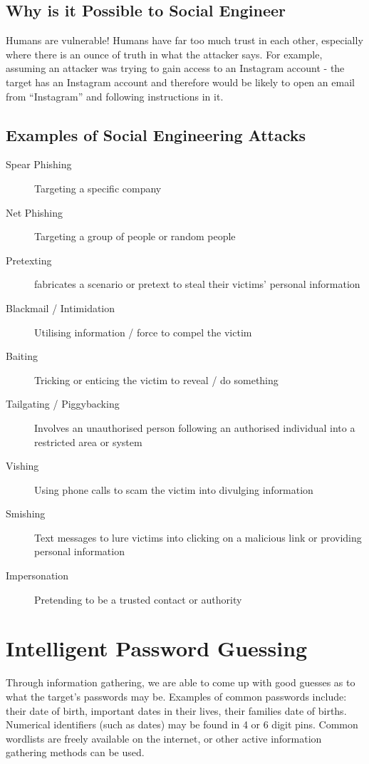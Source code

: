 \subsection{Why is it Possible to Social Engineer}
Humans are vulnerable! Humans have far too much trust in each other, especially where there is an ounce of truth in what the attacker says. For example, assuming an attacker was trying to gain access to an Instagram account - the target has an Instagram account and therefore would be likely to open an email from ``Instagram'' and following instructions in it. 

\subsection{Examples of Social Engineering Attacks}
\begin{description}
    \item[Spear Phishing] Targeting a specific company
    \item[Net Phishing] Targeting a group of people or random people
    \item[Pretexting] fabricates a scenario or pretext to steal their victims' personal information
    \item[Blackmail / Intimidation] Utilising information / force to compel the victim
    \item[Baiting] Tricking or enticing the victim to reveal / do something
    \item[Tailgating / Piggybacking] Involves an unauthorised person following an authorised individual into a restricted area or system
    \item[Vishing] Using phone calls to scam the victim into divulging information
    \item[Smishing] Text messages to lure victims into clicking on a malicious link or providing personal information
    \item[Impersonation] Pretending to be a trusted contact or authority  
\end{description}

\section{Intelligent Password Guessing}
Through information gathering, we are able to come up with good guesses as to what the target's passwords may be. Examples of common passwords include: their date of birth, important dates in their lives, their families date of births. Numerical identifiers (such as  dates) may be found in 4 or 6 digit pins. Common wordlists are freely available on the internet, or other active information gathering methods can be used.\\

